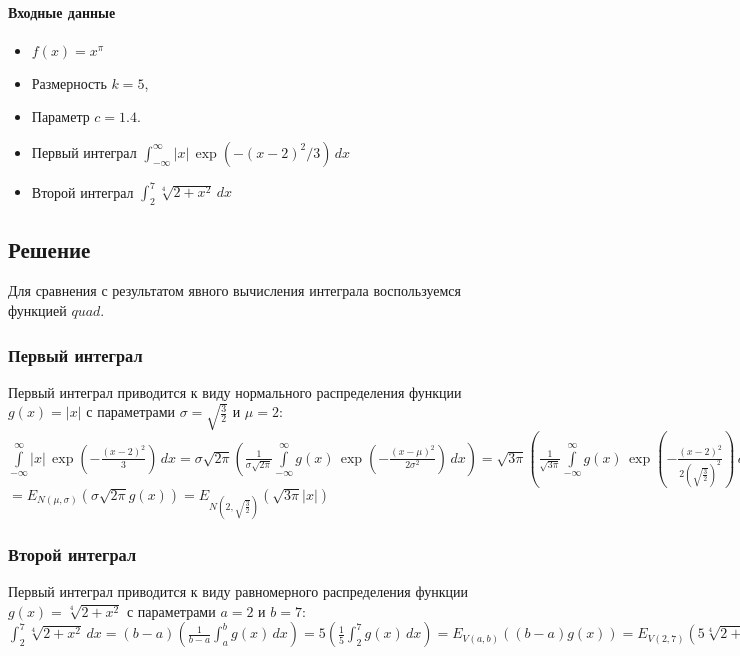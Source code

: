 \documentclass{article}
\begin{document}
            \paragraph{Входные данные}
                \begin{itemize}
                    \item $f(x) = x^\pi$
                    \item Размерность $k = 5$,
                    \item Параметр $c = 1.4$.
                    \item Первый интеграл $\int_{-\infty}^{\infty} |x|\,\exp{(-(x-2)^2/3)}\,dx$
                    \item Второй интеграл $\int_{2}^{7} \sqrt[4]{2+x^2}\,dx$
                \end{itemize}
        \subsection{Решение}
            Для сравнения с результатом явного вычисления интеграла воспользуемся функцией $quad$. 
            \subsubsection{Первый интеграл}
                Первый интеграл приводится к виду нормального распределения функции $g(x) = |x|$ с параметрами $\sigma = \sqrt{\frac{3}{2}}$ и $\mu = 2$:
                \newline
                $\displaystyle \int\limits_{-\infty}^{\infty} |x|\,\exp{(-\frac{(x-2)^2}{3})}\,dx = \sigma\sqrt{2\pi}(\frac{1}{\sigma\sqrt{2\pi}} \int\limits_{-\infty}^{\infty} g(x)\,\exp{(-\frac{(x-\mu)^2}{2\sigma^2})\,dx}) = \sqrt{3\pi}(\frac{1}{\sqrt{3\pi}} \int\limits_{-\infty}^{\infty} g(x)\,\exp{(-\frac{(x-2)^2}{2(\sqrt{\frac{3}{2}})^2})}\,dx) =$ 
                \newline
                $= E_{N(\mu, \sigma)}(\sigma \sqrt{2\pi}g(x)) = E_{N(2, \sqrt{\frac{3}{2}})}( \sqrt{3\pi}|x|)$
            \subsubsection{Второй интеграл}
                Первый интеграл приводится к виду равномерного распределения функции $g(x) = \sqrt[4]{2+x^2}$ с параметрами $a = 2$ и $b = 7$:
                \newline
                $\displaystyle \int_{2}^{7} \sqrt[4]{2+x^2}\,dx = (b - a)(\frac{1}{b - a} \int_{a}^{b} g(x)\,dx) = 5(\frac{1}{5} \int_{2}^{7} g(x)\,dx) = E_{V(a,b)}((b - a)g(x)) = E_{V(2,7)}(5\sqrt[4]{2+x^2})$
\end{document}
